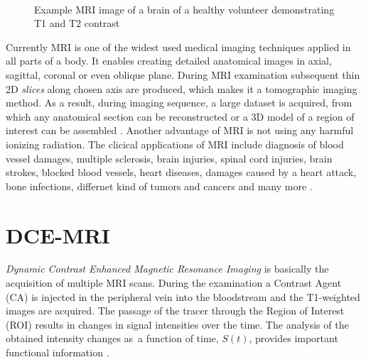  
\begin{figure}
\captionsetup[subfloat]{captionskip=0.5cm}
	\centering
	\hspace{1.5cm}
	\\	
\vspace{0.5cm}
\caption[lol]{Example MRI image of a brain of a healthy volunteer demonstrating T1 and T2 contrast}
\label{fig:t1t2}
\end{figure}

Currently MRI is one of the widest used medical imaging techniques applied in all parts of a body. It enables creating detailed anatomical images in axial, sagittal, coronal or even oblique plane. During MRI examination subsequent thin 2D \textit{slices} along chosen axis are produced, which makes it a tomographic imaging method. As a result, during imaging sequence, a large dataset is acquired, from which any anatomical section can be reconstructed or a 3D model of a region of interest can be assembled \cite {bushong2014magnetic}. Another advantage of MRI is not using any harmful ionizing radiation.
The clicical applications of MRI include diagnosis of blood vessel damages, multiple sclerosis, brain injuries, spinal cord injuries, brain strokes, blocked blood vessels, heart diseases, damages caused by a heart attack, bone infections, differnet kind of tumors and cancers and many more \cite{mriApplications}.

\section{DCE-MRI}
\textit{Dynamic Contrast Enhanced Magnetic Resonance Imaging} is basically the acquisition of multiple MRI scans. During the examination a Contrast Agent (CA) is injected in the peripheral vein into the bloodstream and the T1-weighted images are acquired. 
The passage of the tracer through the Region of Interest (ROI) results in changes in signal intensities over the time.
The analysis of the obtained intensity changes as~a function of time, $S(t)$, provides important functional information \cite{bokacheva2008assessment, khalifa2014models}.

\begin{comment}
Traditionally, this evaluation is performed by experienced observer, although this method is very subjective and strongly depends on the experience of the expert. Other technique involves fitting tissue intensity changes to pharmacokinetic models, which allows quantification of renal function \cite{khalifa2014models}. Even though this strategy is gaining more and more supporters, most of the methods still require interference of the human at some stage, which makes them vulnerable to human factors.
\end{comment}
